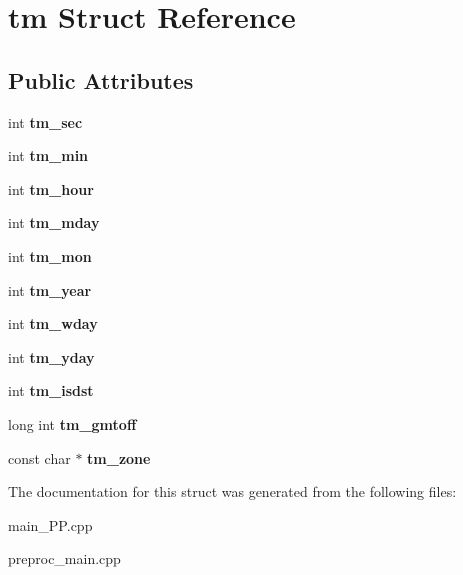 \hypertarget{structtm}{\section{tm Struct Reference}
\label{structtm}
}
\subsection*{Public Attributes}
\begin{DoxyCompactItemize}
\item 
\hypertarget{structtm_a4d098a9a5c03a00b2ee61e10851de81e}{int {\bfseries tm\+\_\+sec}}\label{structtm_a4d098a9a5c03a00b2ee61e10851de81e}

\item 
\hypertarget{structtm_af414eb7c86cc3099595211eee4d4211b}{int {\bfseries tm\+\_\+min}}\label{structtm_af414eb7c86cc3099595211eee4d4211b}

\item 
\hypertarget{structtm_a3e7ca4e37f1abcaf56b8a916c38eb9fe}{int {\bfseries tm\+\_\+hour}}\label{structtm_a3e7ca4e37f1abcaf56b8a916c38eb9fe}

\item 
\hypertarget{structtm_ab8d8904bad43b0c8b96e61941c5b5310}{int {\bfseries tm\+\_\+mday}}\label{structtm_ab8d8904bad43b0c8b96e61941c5b5310}

\item 
\hypertarget{structtm_a112ac36fa2f593777138a417cf031e17}{int {\bfseries tm\+\_\+mon}}\label{structtm_a112ac36fa2f593777138a417cf031e17}

\item 
\hypertarget{structtm_a33adf78fd6476b2120ce3b9c4a852053}{int {\bfseries tm\+\_\+year}}\label{structtm_a33adf78fd6476b2120ce3b9c4a852053}

\item 
\hypertarget{structtm_afe81a8c46f1c693c43f259b288859f4f}{int {\bfseries tm\+\_\+wday}}\label{structtm_afe81a8c46f1c693c43f259b288859f4f}

\item 
\hypertarget{structtm_a93a0ba77cc23796df84405dcbcc57eb1}{int {\bfseries tm\+\_\+yday}}\label{structtm_a93a0ba77cc23796df84405dcbcc57eb1}

\item 
\hypertarget{structtm_a5645ca0580c8ab2c24f6c2965d9c9f9c}{int {\bfseries tm\+\_\+isdst}}\label{structtm_a5645ca0580c8ab2c24f6c2965d9c9f9c}

\item 
\hypertarget{structtm_ab76d309569eaf7b4e3c777430086f362}{long int {\bfseries tm\+\_\+gmtoff}}\label{structtm_ab76d309569eaf7b4e3c777430086f362}

\item 
\hypertarget{structtm_ad420a25c0a1cc467b491c9be42289772}{const char $\ast$ {\bfseries tm\+\_\+zone}}\label{structtm_ad420a25c0a1cc467b491c9be42289772}

\end{DoxyCompactItemize}


The documentation for this struct was generated from the following files\+:\begin{DoxyCompactItemize}
\item 
main\+\_\+\+P\+P.\+cpp\item 
preproc\+\_\+main.\+cpp\end{DoxyCompactItemize}
